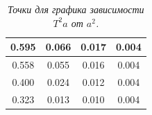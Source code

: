 \documentclass[a4paper,12pt]{report}
\begin{document}
\begin{table}[]
\begin{tabular}{|c|c|c|c|}
0.595                                                                                    & 0.066                                                          & 0.017                                                                      & 0.004                                                                  \\ \hline
0.558                                                                                    & 0.055                                                          & 0.016                                                                      & 0.004                                                                  \\ \hline
0.400                                                                                    & 0.024                                                          & 0.012                                                                      & 0.004                                                                  \\ \hline
0.323                                                                                    & 0.013                                                          & 0.010                                                                      & 0.004                                                                  \\ \hline
\end{tabular}
\caption{\textit{Точки для графика зависимости $T^2a$ от $a^2$.}}
\end{table}
\end{document}
